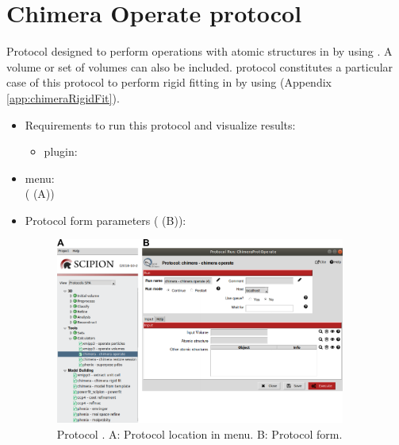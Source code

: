 \section{Chimera Operate protocol}
\label{app:chimeraOperate}%

Protocol designed to perform operations with atomic structures in \scipion by using \chimera. A volume or set of volumes can also be included. \chimera {} protocol constitutes a particular case of this protocol to perform rigid fitting in \scipion by using \chimera (Appendix \ref{app:chimeraRigidFit}).\\

 \begin{itemize}
  \item Requirements to run this protocol and visualize results:
    \begin{itemize}
        \item \scipion plugin: 
    \end{itemize}
  \item \scipion menu:\\
    ( (A))\\
  
  \item Protocol form parameters ( (B)):\\
  
    \begin{figure}[H]
     \centering 
     \captionsetup{width=.7\linewidth} 
     \includegraphics[width=0.90\textwidth]{Images_appendix/Fig117.pdf}
     \caption{Protocol . A: Protocol location in \scipion menu. B: Protocol form.}
     \label{fig:app_protocol_chimera_2}
    \end{figure}
    

\end{itemize}
